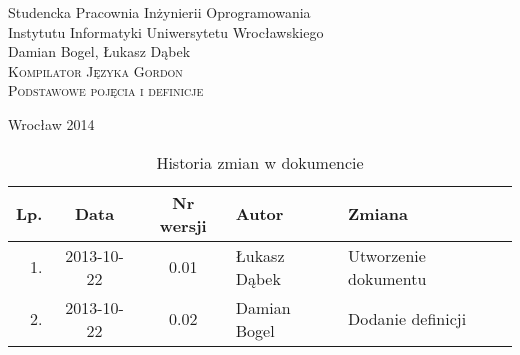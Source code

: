 \documentclass{documentation}
\begin{document}
\begin{titlepage}
\begin{center}
Studencka Pracownia Inżynierii Oprogramowania\\
Instytutu Informatyki Uniwersytetu Wrocławskiego\\[6cm]

Damian Bogel, Łukasz Dąbek\\[1cm]
\textsc{\LARGE Kompilator Języka Gordon}\\[0.5cm]
\textsc{\large Podstawowe pojęcia i definicje}

\vfill
Wrocław 2014 \\[2.5cm]

\end{center}
\end{titlepage}

\newpage
\begin{table}
	\centering
    \captionsetup{name=Tabela,labelsep=period}
	\caption{Historia zmian w dokumencie}
		\begin{tabular}{|r|c|c|l|l|}
		\hline
		Lp.  & Data       & Nr wersji & Autor                 & Zmiana \\ \hline
		1.   & 2013-10-22 & 0.01 & Łukasz Dąbek & Utworzenie dokumentu \\ \hline
        2.   & 2013-10-22 & 0.02 & Damian Bogel & Dodanie definicji \\ \hline
	\end{tabular}
\end{table}
\newpage

\tableofcontents
\setcounter{page}{2}

\newpage
\end{document}
